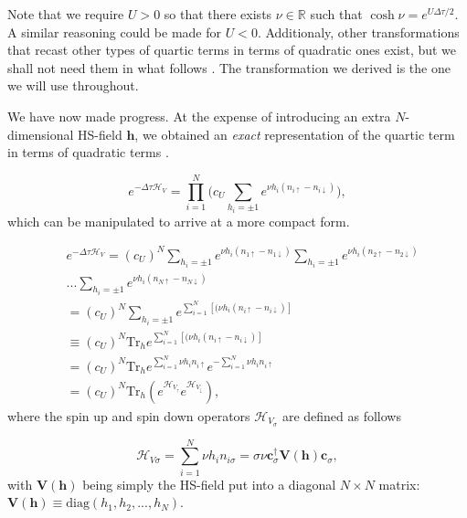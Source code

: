 \documentclass[10pt, twocolumn, twoside]{article}
\begin{document}
Note that we require $U > 0$ so that there exists $\nu \in \mathbb{R}$ such that $\cosh \nu = e^{U\Delta \tau / 2}$. A similar reasoning could be made for $U < 0$. Additionaly, other transformations that recast other types of quartic terms in terms of quadratic ones exist, but we shall not need them in what follows \cite{Hirsch1983}. The transformation we derived is the one we will use throughout.

We have now made progress. At the expense of introducing an extra $N$-dimensional HS-field $\bm h$, we obtained an \emph{exact} representation of the quartic term in terms of quadratic terms \cite{Bai2006}.

\begin{equation} 
 e^{-\Delta\tau \mathcal{H}_V} = \prod_{i=1}^N \bigg( c_U \sum_{h_i = \pm 1} e^{\nu h_i ( n_{i\uparrow} - n_{i\downarrow} )} \bigg),
\end{equation} 
which can be manipulated to arrive at a more compact form.

\begin{equation}\label{eq:exp_quartic}
\begin{split}
&e^{-\Delta\tau \mathcal{H}_V} =  (c_U)^N \sum_{h_i = \pm 1} e^{\nu h_i ( n_{1\uparrow} - n_{1\downarrow} )} \sum_{h_i = \pm 1} e^{\nu h_i ( n_{2\uparrow} - n_{2\downarrow} )}  \\
&... \sum_{h_i = \pm 1} e^{\nu h_i ( n_{N\uparrow} - n_{N\downarrow} )} \\
&= (c_U)^N \sum_{h_i = \pm 1} e^{\sum_{i=1}^N [(\nu h_i ( n_{i\uparrow} - n_{i\downarrow} ) ]} \\
&\equiv (c_U)^N \text{Tr}_h e^{\sum_{i=1}^N [(\nu h_i ( n_{i\uparrow} - n_{i\downarrow} ) ]} \\
&= (c_U)^N \text{Tr}_h e^{\sum_{i=1}^N \nu h_i n_{i\uparrow}} e^{-\sum_{i=1}^N \nu h_i n_{i\uparrow}} \\
&= (c_U)^N \text{Tr}_h ( e^{\mathcal{H}_{V_\uparrow}} e^{\mathcal{H}_{V_\downarrow}} ) ,
\end{split}
\end{equation}
where the spin up and spin down operators $\mathcal{H}_{V_\sigma}$ are defined as follows

\begin{equation}
\mathcal{H}_{V\sigma} = \sum_{i=1}^N \nu h_i n_{i\sigma} = \sigma \nu \bm c_\sigma^\dagger \bm V(\bm h) \bm c_\sigma,
\end{equation}
with $\bm V(\bm h)$ being simply the HS-field put into a diagonal $N\times N$ matrix: $\bm V(\bm h) \equiv \text{diag}(h_1, h_2, ..., h_N)$.
\end{document}
